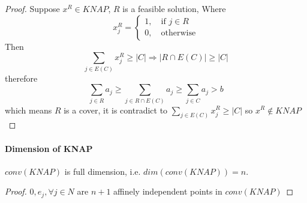                     \begin{proof}
                        Suppose $x^R \in KNAP$, $R$ is a feasible solution, Where
                        \begin{equation*}
                            x^R_j = \begin{cases}1, \quad \text{if $j\in R$} \\ 0, \quad \text{otherwise}\end{cases} 
                        \end{equation*}
                        Then
                        \begin{equation*}
                            \sum_{j\in E(C)}x^R_j \ge |C| \Rightarrow |R \cap E(C)| \ge |C|  
                        \end{equation*}
                        therefore
                        \begin{equation*}
                            \sum_{j\in R}a_j \ge \sum_{j\in R \cap E(C)} a_j \ge \sum_{j\in C} a_j > b 
                        \end{equation*}
                        which means $R$ is a cover, it is contradict to $\sum_{j\in E(C)}x^R_j \ge |C|$ so $x^R \notin KNAP$
                    \end{proof}

                \paragraph{Dimension of KNAP}
                    $conv(KNAP)$ is full dimension, i.e. $dim(conv(KNAP))=n$.\\
                    \begin{proof}
                        $0, e_j, \forall j\in N$ are $n + 1$ affinely independent points in $conv(KNAP)$
                    \end{proof}

